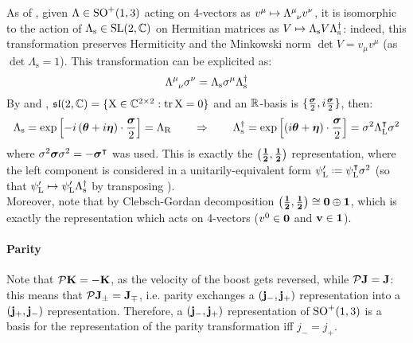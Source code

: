 As of , given $ \Lambda \in \mathrm{SO}^+(1,3) $ acting on 4-vectors as $ v^\mu \mapsto \tensor{\Lambda}{^\mu _\nu} v^\nu $, it is isomorphic to the action of $ \Lambda_\text{s} \in \mathrm{SL}(2,\mathbb{C}) $ on Hermitian matrices as $ V \mapsto \Lambda_\text{s} V \mathrm{\Lambda}_\text{s}^\dagger $: indeed, this transformation preserves Hermiticity and the Minkowski norm $ \det V = v_\mu v^\mu $ (as $ \det \Lambda_\text{s} = 1 $). This transformation can be explicited as:
\begin{equation}
  \tensor{\Lambda}{^\mu_\nu} \sigma^\nu = \Lambda_\text{s} \sigma^\mu \Lambda_\text{s}\dg
\end{equation}
By  and , $ \mathfrak{sl}(2,\mathbb{C}) = \{\mathrm{X} \in \mathbb{C}^{2 \times 2} : \operatorname{tr} \mathrm{X} = 0\} $ and an $ \mathbb{R} $-basis is $ \{\frac{\boldsymbol{\sigma}}{2},i\frac{\boldsymbol{\sigma}}{2}\} $, then:
\begin{equation*}
  \Lambda_\text{s} = \exp \left[ -i \left( \boldsymbol{\theta} + i \boldsymbol{\eta} \right) \cdot \frac{\boldsymbol{\sigma}}{2} \right] = \Lambda_\text{R}
  \qquad
  \Rightarrow
  \qquad
  \Lambda_\text{s}^\dagger = \exp \left[ \left( i \boldsymbol{\theta} + \boldsymbol{\eta} \right) \cdot \frac{\boldsymbol{\sigma}}{2} \right] = \sigma^2 \Lambda_\text{L}^\intercal \sigma^2
\end{equation*}
where $ \sigma^2 \boldsymbol{\sigma} \sigma^2 = - \boldsymbol{\sigma}^\intercal $ was used. This is exactly the $ \mathbf{\left( \frac{1}{2},\frac{1}{2} \right)} $ representation, where the left component is considered in a unitarily-equivalent form $ \psi_\text{L}' \defeq \psi_\text{L}^\intercal \sigma^2 $ (so that $ \psi_\text{L}' \mapsto \psi_\text{L}' \Lambda_\text{s}^\dagger $ by transposing ).\\
Moreover, note that by Clebsch-Gordan decomposition $ \mathbf{\left( \frac{1}{2},\frac{1}{2} \right)} \cong \mathbf{0} \oplus \mathbf{1} $, which is exactly the representation which acts on 4-vectors ($ v^0 \in \mathbf{0} $ and $ \mathbf{v} \in \mathbf{1} $).

\paragraph{Parity}

Note that $ \mathcal{P} \mathbf{K} = -\mathbf{K} $, as the velocity of the boost gets reversed, while $ \mathcal{P} \mathbf{J} = \mathbf{J} $: this means that $ \mathcal{P} \mathbf{J}_\pm = \mathbf{J}_\mp $, i.e. parity exchanges a $ \mathbf{\left( j_-,j_+ \right)} $ representation into a $ \mathbf{\left( j_+,j_- \right)} $ representation. Therefore, a $ \mathbf{\left( j_-,j_+ \right)} $ representation of $ \mathrm{SO}^+(1,3) $ is a basis for the representation of the parity transformation iff $ j_- = j_+ $.

